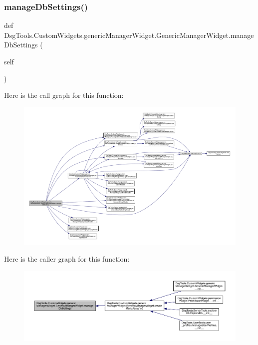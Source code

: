\subsubsection{\texorpdfstring{manage\+Db\+Settings()}{manageDbSettings()}}
{\footnotesize\ttfamily def Dsg\+Tools.\+Custom\+Widgets.\+generic\+Manager\+Widget.\+Generic\+Manager\+Widget.\+manage\+Db\+Settings (\begin{DoxyParamCaption}\item[{}]{self }\end{DoxyParamCaption})}

 Here is the call graph for this function\+:
\nopagebreak
\begin{figure}[H]
\begin{center}
\leavevmode
\includegraphics[width=350pt]{class_dsg_tools_1_1_custom_widgets_1_1generic_manager_widget_1_1_generic_manager_widget_a0e4887cc182ef03c39f817b816454c54_cgraph}
\end{center}
\end{figure}
Here is the caller graph for this function\+:
\nopagebreak
\begin{figure}[H]
\begin{center}
\leavevmode
\includegraphics[width=350pt]{class_dsg_tools_1_1_custom_widgets_1_1generic_manager_widget_1_1_generic_manager_widget_a0e4887cc182ef03c39f817b816454c54_icgraph}
\end{center}
\end{figure}
